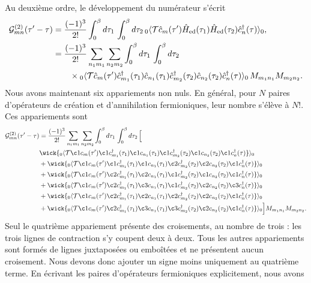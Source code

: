 Au deuxième ordre, le développement du numérateur s'écrit
\begin{align}
    \mathcal{G}^{(2)}_{mn}(\tau'-\tau) &= \frac{(-1)^3}{2!}\int_0^\beta d\tau_1\,\int_0^\beta d\tau_2\, {}_0\langle\mathcal{T}\hat{c}_m(\tau')\hat{H}_\text{ed}(\tau_1)\hat{H}_\text{ed}(\tau_2)\hat{c}^\dag_{n}(\tau)\rangle_0,\notag\\
    & = \frac{(-1)^3}{2!}\sum_{n_1m_1}\sum_{n_2m_2}\int_0^\beta d\tau_1\,\int_0^\beta d\tau_2\,\notag\\
    &\qquad\times {}_0\langle\mathcal{T}\hat{c}_m(\tau')\hat{c}_{m_1}^\dag(\tau_1)\hat{c}_{n_1}(\tau_1)\hat{c}_{m_2}^\dag(\tau_2)\hat{c}_{n_2}(\tau_2)\hat{c}_n^\dag(\tau)\rangle_0\,M_{m_1n_1}M_{m_2n_2}.
\end{align}
Nous avons maintenant six appariements non nuls. En général, pour $N$ paires d'opérateurs de création et d'annihilation fermioniques, leur nombre s'élève à $N!$. Ces appariements sont
\begin{align}
    \mathcal{G}_{mn}^{(2)}(\tau'-\tau) &= \frac{(-1)^3}{2!}\sum_{n_1m_1}\sum_{n_2m_2}\int_0^\beta d\tau_1\,\int_0^\beta d\tau_2\,\Big[\nonumber\\
    &\wick{{}_0\langle\mathcal{T} \c1 c_{m}(\tau') \c1 c_{m_1}^\dag(\tau_1) \c1 c_{n_1}(\tau_1) \c1 c_{m_2}^\dag(\tau_2) \c1 c_{n_2}(\tau_2) \c1 c_{n}^\dag(\tau)}\rangle_0\nonumber\\
    &+\wick{{}_0\langle\mathcal{T} \c1 c_{m}(\tau') \c1 c_{m_1}^\dag(\tau_1) \c1 c_{n_1}(\tau_1) \c2 c_{m_2}^\dag(\tau_2) \c2 c_{n_2}(\tau_2)\c1 c_{n}^\dag(\tau)}\rangle_0\nonumber\\
    &+\wick{{}_0\langle\mathcal{T} \c1 c_{m}(\tau') \c2 c_{m_1}^\dag(\tau_1) \c2 c_{n_1}(\tau_1) \c1 c_{m_2}^\dag(\tau_2) \c1 c_{n_2}(\tau_2) \c1 c_{n}^\dag(\tau)}\rangle_0\nonumber\\
    &+\wick{{}_0\langle\mathcal{T} \c1 c_{m}(\tau') \c2 c_{m_1}^\dag(\tau_1) \c3 c_{n_1}(\tau_1) \c1 c_{m_2}^\dag(\tau_2) \c2 c_{n_2}(\tau_2) \c3 c_{n}^\dag(\tau)}\rangle_0\nonumber\\
    &+\wick{{}_0\langle\mathcal{T} \c1 c_{m}(\tau')\c2 c_{m_1}^\dag(\tau_1)\c2 c_{n_1}(\tau_1)\c2 c_{m_2}^\dag(\tau_2)\c2 c_{n_2}(\tau_2) \c1 c_{n}^\dag(\tau)}\rangle_0\nonumber\\
    &+\wick{{}_0\langle\mathcal{T} \c1 c_{m}(\tau') \c2 c_{m_1}^\dag(\tau_1)\c3 c_{n_1}(\tau_1)\c3 c_{m_2}^\dag(\tau_2)\c2 c_{n_2}(\tau_2)\c1 c_{n}^\dag(\tau)}\rangle_0\Big]M_{m_1n_1}M_{m_2n_2}.
\end{align}
Seul le quatrième appariement présente des croisements, au nombre de trois : les trois lignes de contraction s'y coupent deux à deux. Tous les autres appariements sont formés de lignes juxtaposées ou emboîtées et ne présentent aucun croisement. Nous devons donc ajouter un signe moins uniquement au quatrième terme. En écrivant les paires d'opérateurs fermioniques explicitement, nous avons
